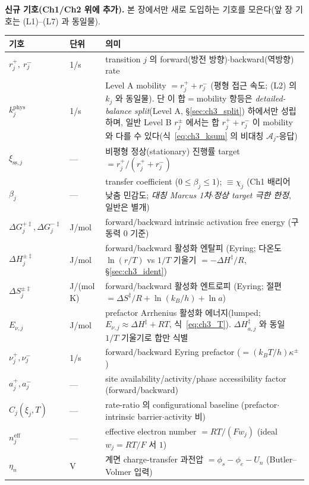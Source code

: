 \documentclass[11pt,a4paper]{article}
\newcommand{\eff}{\mathrm{eff}}
\newcommand{\sstat}{\mathrm{ss}}
\begin{document}
\textbf{신규 기호(Ch1/Ch2 위에 추가).} 본 장에서만 새로 도입하는 기호를 모은다(앞 장 기호는 (L1)--(L7) 과 동일물).
\begin{longtable}{p{} p{} >{\raggedright\arraybackslash}p{}}
\toprule 기호 & 단위 & 의미 \\ \midrule \endhead
$r_j^+,\ r_j^-$ & 1/s & transition $j$ 의 forward(방전 방향)$\cdot$backward(역방향) rate \\
$k_j^{\mathrm{phys}}$ & 1/s & Level A mobility $=r_j^++r_j^-$ (평형 접근 속도; (L2) 의 $k_j$ 와 동일물). 단 이 합$=$mobility 항등은 \emph{detailed-balance split}(Level A, \S\ref{sec:ch3_split}) 하에서만 성립하며, 일반 Level B $r_j^\pm$ 에서는 합 $r_j^++r_j^-$ 이 mobility 와 다를 수 있다(식~\eqref{eq:ch3_ksum} 의 비대칭 $\mathcal A_j$-응답) \\
$\xi_{\sstat,j}$ & --- & 비평형 정상(stationary) 진행률 target $=r_j^+/(r_j^++r_j^-)$ \\
$\beta_j$ & --- & transfer coefficient ($0\le\beta_j\le1$); \textbf{$\equiv\chi_j$} (Ch1 배리어 낮춤 민감도; \emph{대칭 Marcus 1차$\cdot$정상 target 극한 한정}, 일반은 별개) \\
$\Delta G_j^{+\ddagger},\Delta G_j^{-\ddagger}$ & J/mol & forward/backward intrinsic activation free energy (구동력 $0$ 기준) \\
$\Delta H_j^{\pm\ddagger}$ & J/mol & forward/backward 활성화 엔탈피 (Eyring; 다온도 $\ln(r/T)$ vs $1/T$ 기울기 $=-\Delta H^\ddagger/R$, \S\ref{sec:ch3_ident}) \\
$\Delta S_j^{\pm\ddagger}$ & J/(mol\,K) & forward/backward 활성화 엔트로피 (Eyring; 절편 $=\Delta S^\ddagger/R+\ln(k_B/h)+\ln a$) \\
$E_{\nu,j}$ & J/mol & prefactor Arrhenius 활성화 에너지(lumped; $E_{\nu,j}\approx\Delta H^\ddagger+RT$, 식~\eqref{eq:ch3_T}). $\Delta H_{a,j}^\ddagger$ 와 동일 $1/T$ 기울기로 합만 식별 \\
$\nu_j^+,\nu_j^-$ & 1/s & forward/backward Eyring prefactor ($=(k_BT/h)\kappa^\pm$) \\
$a_j^+,a_j^-$ & --- & site availability/activity/phase accessibility factor (forward/backward) \\
$C_j(\xi_j,T)$ & --- & rate-ratio 의 configurational baseline (prefactor$\cdot$intrinsic barrier$\cdot$activity 비) \\
$n_j^{\eff}$ & --- & effective electron number $=RT/(Fw_j)$ (ideal $w_j=RT/F$ 서 $1$) \\
$\eta_n$ & V & 계면 charge-transfer 과전압 $=\phi_s-\phi_e-U_n$ (Butler--Volmer 입력) \\

\end{longtable}
\end{document}
